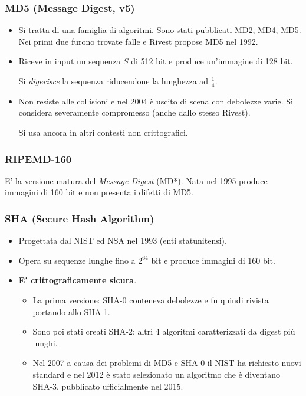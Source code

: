 \subsubsection{MD5 (Message Digest, v5)}
\begin{itemize}
	\item Si tratta di una famiglia di algoritmi. 	Sono stati pubblicati MD2, MD4, MD5. Nei primi due furono trovate falle e Rivest propose MD5 nel 1992.
	
	\item Riceve in input un sequenza $S$ di 512 bit e produce un'immagine di 128 bit.
	
	Si \emph{digerisce} la sequenza riducendone la lunghezza ad $\frac{1}{4}$.
	
	\item Non resiste alle collisioni e nel 2004 è uscito di scena con debolezze varie. Si considera severamente compromesso (anche dallo stesso Rivest).
	
	Si usa ancora in altri contesti non crittografici.
\end{itemize}

\subsubsection{RIPEMD-160}
E' la versione matura del \emph{Message Digest} (MD*). Nata nel 1995 produce immagini di 160 bit e non presenta i difetti di MD5.

\subsubsection{SHA (Secure Hash Algorithm)}
\begin{itemize}
	\item Progettata dal NIST ed NSA nel 1993 (enti statunitensi).
	\item Opera su sequenze lunghe fino a $2^{64}$ bit e produce immagini di 160 bit.
	\item \textbf{E' crittograficamente sicura}.
	\begin{itemize}
		\item La prima versione: SHA-0 conteneva debolezze e fu quindi rivista portando allo SHA-1.
		
		\item Sono poi stati creati SHA-2: altri 4 algoritmi caratterizzati da digest più lunghi.
		
		\item Nel 2007 a causa dei problemi di MD5 e SHA-0 il NIST ha richiesto nuovi standard e nel 2012 è stato selezionato un algoritmo che è diventano SHA-3, pubblicato ufficialmente nel 2015.
	\end{itemize}
\end{itemize}


